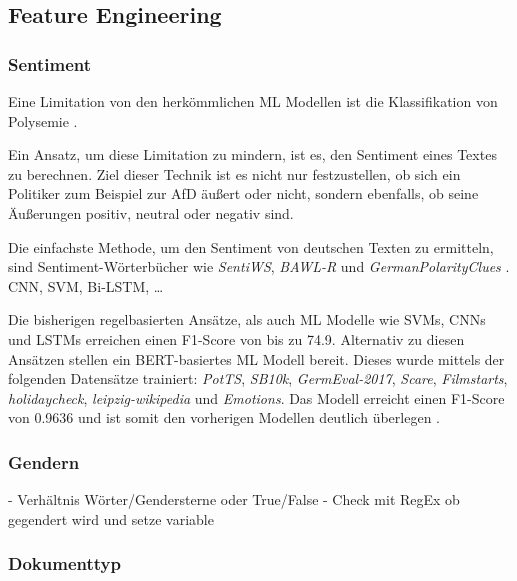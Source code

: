 \subsection{Feature Engineering} \label{subsec:featureEngineering}


\subsubsection{Sentiment}

Eine Limitation von den herkömmlichen \ac{ML} Modellen ist die Klassifikation von Polysemie \autocite[48\psq]{kowsari_text_2019}. 


Ein Ansatz, um diese Limitation zu mindern, ist es, den Sentiment eines Textes zu berechnen. Ziel dieser Technik ist es nicht nur festzustellen, ob sich ein Politiker zum Beispiel zur \ac{AfD} äußert oder nicht, sondern ebenfalls, ob seine Äußerungen positiv, neutral oder negativ sind.


Die einfachste Methode, um den Sentiment von deutschen Texten zu ermitteln, sind Sentiment-Wörterbücher wie \textit{SentiWS}, \textit{BAWL-R} und \textit{GermanPolarityClues} \autocite[1627\psq]{guhr_training_2020}. CNN, SVM, Bi-LSTM, \dots

Die bisherigen regelbasierten Ansätze, als auch \ac{ML} Modelle wie \acp{SVM}, \acp{CNN} und \acp{LSTM} erreichen einen F1-Score von bis zu \num{74.9}. Alternativ zu diesen Ansätzen stellen \textcite{guhr_training_2020} ein \ac{BERT}-basiertes \ac{ML} Modell bereit. Dieses wurde mittels der folgenden Datensätze trainiert: \textit{PotTS}, \textit{SB10k}, \textit{GermEval-2017}, \textit{Scare}, \textit{Filmstarts}, \textit{holidaycheck}, \textit{leipzig-wikipedia} und \textit{Emotions}. Das Modell erreicht einen F1-Score von \num{0.9636} und ist somit den vorherigen Modellen deutlich überlegen \autocite[1631]{guhr_training_2020}.

\subsubsection{Gendern}

- Verhältnis Wörter/Gendersterne oder True/False
- Check mit RegEx ob gegendert wird und setze variable

\subsubsection{Dokumenttyp}

